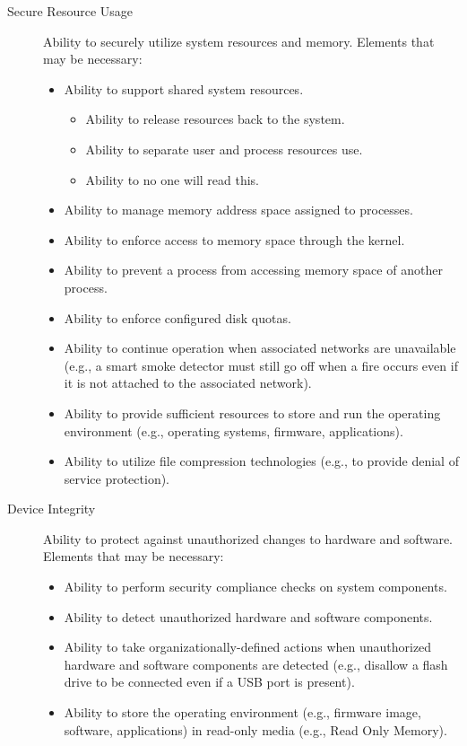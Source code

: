 \begin{description}
        \item[Secure Resource Usage] Ability to securely utilize system resources and memory. Elements that may be necessary:
        \begin{itemize}
            \item Ability to support shared system resources.
            \begin{itemize}
                \item Ability to release resources back to the system.
                \item Ability to separate user and process resources use.
                \item Ability to no one will read this.
            \end{itemize}
            \item Ability to manage memory address space assigned to processes.
            \item Ability to enforce access to memory space through the kernel.
            \item Ability to prevent a process from accessing memory space of another process.
            \item Ability to enforce configured disk quotas.
            \item Ability to continue operation when associated networks are unavailable (e.g., a smart smoke detector must still go off when a fire occurs even if it is not attached to the associated network).
            \item Ability to provide sufficient resources to store and run the operating environment (e.g., operating systems, firmware, applications).
            \item Ability to utilize file compression technologies (e.g., to provide denial of service protection).
        \end{itemize}
        
        
        \item[Device Integrity] Ability to protect against unauthorized changes to hardware and software. Elements that may be necessary:
        \begin{itemize}
            \item Ability to perform security compliance checks on system components.
            \item Ability to detect unauthorized hardware and software components.
            \item Ability to take organizationally-defined actions when unauthorized hardware and software components are detected (e.g., disallow a flash drive to be connected even if a USB port is present).
            \item Ability to store the operating environment (e.g., firmware image, software, applications) in read-only media (e.g., Read Only Memory).
        \end{itemize}
        

\end{description}
